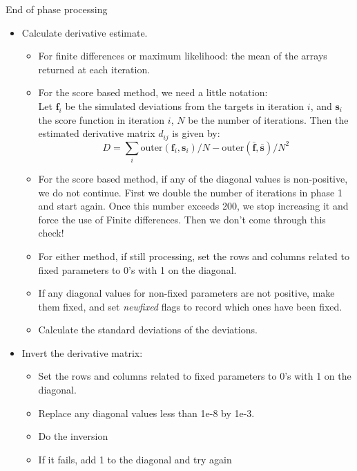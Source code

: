 \documentclass[12pt,a4paper]{article}
\makeatletter
\renewcommand{\=}{\,=\,}
\newcommand{\+}{\,+\,}
\newcommand{\nnm}[1]{\textsf{\textit{#1}}}
\renewcommand{\subsubsection}{\@startsection{subsubsection}{3}
                {0pt}{0.5\baselineskip}{0.3\baselineskip}
                {\it\sffamily} }
\makeatother
\begin{document}
\subsubsection{End of phase processing}
\begin{itemize}
\item Calculate derivative estimate.
\begin{itemize}
\item
For finite differences or maximum likelihood: the mean of the arrays
returned at each iteration.
\item For the score based method, we need a little notation:\\
  Let $\mathbf{f}_i$ be the simulated deviations from the targets in
  iteration $i$, and $\mathbf{s}_i$ the score function in iteration
  $i$, $N$ be the number of iterations. Then the estimated derivative
  matrix $d_{ij}$ is given by:
$$
D = \sum_i \mathrm{outer}(\mathbf{f}_i,\mathbf{s}_i)/ N -
\mathrm{outer}(\bar{\mathbf{f}}, \bar{\mathbf{s}})/N^2
$$
\item For the score based method, if any of the diagonal values is
  non-positive, we do not continue. First we double the number of
  iterations in phase 1 and start again. Once this number exceeds 200,
  we stop increasing it and force the use of Finite differences. Then
  we don't come through this check!
\item
For either method, if still processing, set the rows and columns related to fixed
parameters to 0's with 1 on the diagonal.
\item
If any diagonal values for non-fixed parameters are not positive, make
them fixed, and set \nnm{newfixed} flags to record which ones have
been fixed.
\item
Calculate the standard deviations of the deviations.
\end{itemize}
\item Invert the derivative matrix:
\begin{itemize}
\item
  Set the rows and columns related to fixed parameters to 0's with 1 on the diagonal.
\item
  Replace any diagonal values less than 1e-8 by 1e-3.
\item
 Do the inversion
\item
If it fails, add 1 to the diagonal and try again
\end{itemize}


\end{itemize}
\end{document}
